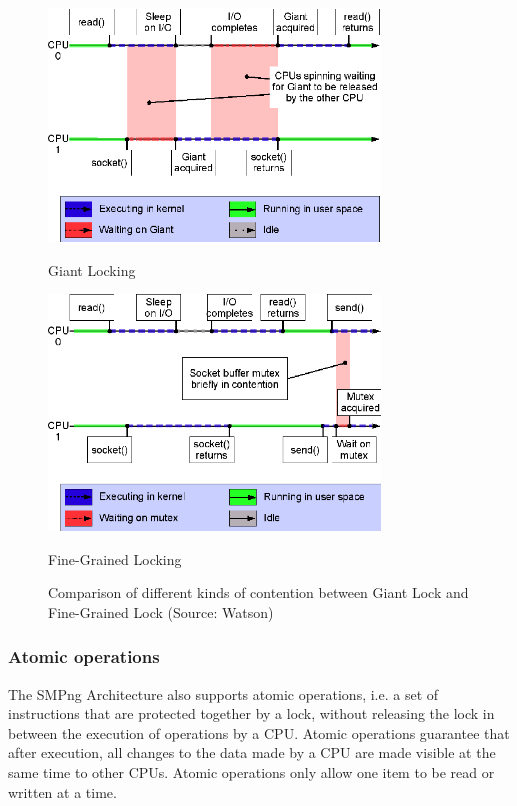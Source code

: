 \documentclass[12pt, dvipsnames, a4paper]{article}
\begin{document}
\begin{figure}[!h]
	\begin{minipage}[c]{0.4\linewidth}
		\centering
		\includegraphics[width = 250pt]{assets/concurrency_diagrams/figureA.png}
		\caption{Giant Locking}
	\end{minipage}\hfill
	\begin{minipage}[c]{0.5\linewidth}
		\centering
		\includegraphics[width = 250pt]{assets/concurrency_diagrams/figureB.png}
		\caption{Fine-Grained Locking}
	\end{minipage}
	\caption{Comparison of different kinds of contention between Giant Lock and Fine-Grained Lock (Source: Watson) \cite{watson}}
\end{figure}

\subsubsection{Atomic operations}

The SMPng Architecture also supports atomic operations, i.e. a set of instructions that are protected together by a lock, without releasing the lock in between the execution of operations by a CPU. Atomic operations guarantee that after execution, all changes to the data made by a CPU are made visible at the same time to other CPUs. Atomic operations only allow one item to be read or written at a time.
\end{document}
